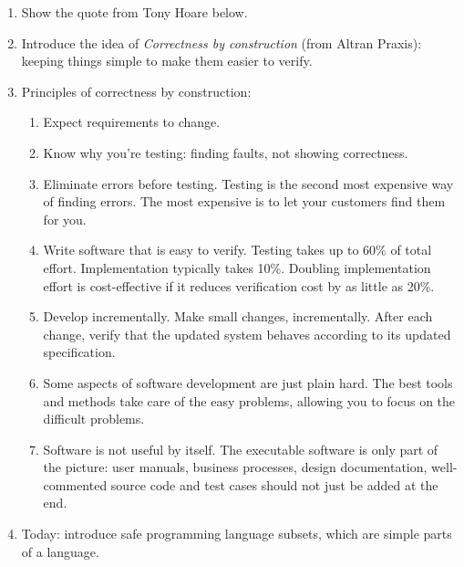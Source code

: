 \documentclass[11pt]{article}
\begin{document}
\begin{enumerate}

  \item Show the quote from Tony Hoare below.

  \item Introduce the idea of \emph{Correctness by construction} (from Altran Praxis): keeping things simple to make them easier to verify.

  \item Principles of correctness by construction:

  \begin{enumerate}

    \item Expect requirements to change. 
 
    \item Know why you're testing: finding faults, not showing correctness.

    \item Eliminate errors before testing. Testing is the second most expensive way of finding errors. The most expensive is to let your customers find them for you.

    \item Write software that is easy to verify. Testing takes up to 60\% of total effort. Implementation typically takes 10\%. Doubling  implementation effort is cost-effective if it reduces verification cost by as little as 20\%.

    \item Develop incrementally. Make small changes, incrementally. After each change, verify that the updated system behaves according to its updated specification. 

    \item Some aspects of software development are just plain hard.  The best tools and methods take care of the easy problems, allowing you to focus on the difficult problems.

    \item Software is not useful by itself. The executable software is only part of the picture:   user manuals, business processes, design documentation, well-commented source code and test cases should not just be   added at the end.

  \end{enumerate}

  \item Today: introduce safe programming language subsets, which are simple parts of a language.

\end{enumerate}
\end{document}
